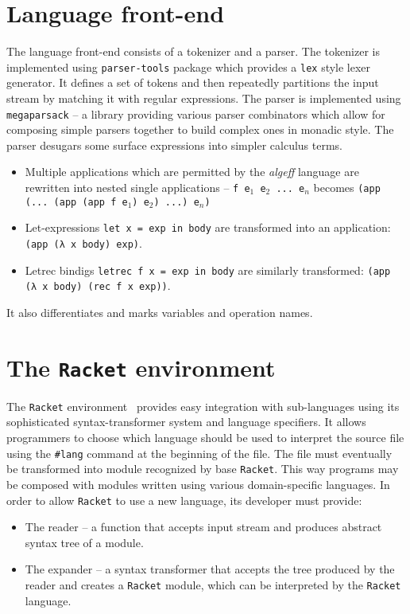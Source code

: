 \documentclass[inz, english, longabstract]{iithesis}
\newcommand{\Racket}{\texttt{Racket}}
\begin{document}
\section{Language front-end}\label{sec:front-end}
The language front-end consists of a tokenizer and a parser.
The tokenizer is implemented using \texttt{parser-tools} package which provides a \texttt{lex} style lexer generator.
It defines a set of tokens and then repeatedly partitions the input stream by matching it with regular expressions.
The parser is implemented using \texttt{megaparsack} -- a library providing various parser combinators which allow for composing simple parsers together to build complex ones in monadic style.
The parser desugars some surface expressions into simpler calculus terms.
\begin{itemize}
  \item Multiple applications which are permitted by the \emph{algeff} language are rewritten into nested single applications -- \texttt{f e$_1$ e$_2$ ... e$_n$} becomes \texttt{(app (... (app (app f e$_1$) e$_2$) ...) e$_n$)}
  \item Let-expressions \texttt{let x = exp in body} are transformed into an application: \texttt{(app (λ x body) exp)}.
  \item Letrec bindigs \texttt{letrec f x = exp in body} are similarly transformed: \texttt{(app (λ x body) (rec f x exp))}.
\end{itemize}
It also differentiates and marks variables and operation names.

\section{The \Racket{} environment}\label{sec:racket-env}
The \Racket{} environment~\cite{PLT1} provides easy integration with sub-languages using its sophisticated syntax-transformer system and language specifiers.
It allows programmers to choose which language should be used to interpret the source file using the \texttt{\#lang} command at the beginning of the file.
The file must eventually be transformed into module recognized by base \Racket{}.
This way programs may be composed with modules written using various domain-specific languages.
In order to allow \Racket{} to use a new language, its developer must provide:
\begin{itemize}
  \item The reader -- a function that accepts input stream and produces abstract syntax tree of a module.
  \item The expander -- a syntax transformer that accepts the tree produced by the reader and creates a \Racket{} module, which can be interpreted by the \Racket{} language.
\end{itemize}
\end{document}
